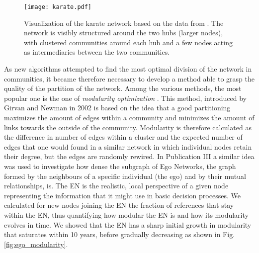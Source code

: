  \begin{figure}[h]
\centering
\texttt{[image: karate.pdf]}%
\caption{Visualization of the karate network based on the data from \cite{10.2307/3629752}. The network is visibly structured around the two hubs 
(larger nodes), with clustered communities around each hub and a few nodes acting as intermediaries between the two communities.}
\label{fig:karate}
\end{figure}

As new algorithms attempted to find the most optimal division of the network in communities, it 
became therefore necessary to develop a method able to grasp the quality of the partition of the network. Among the various methods, the most popular one is the one of \textit{modularity optimization} \cite{Fortunato201075}.
This method, introduced by Girvan and Newman in 2002 \cite{Girvan11062002} is based on the idea that a good partitioning maximizes the amount of edges within a community and minimizes the amount of links towards the outside of the community. 
Modularity is therefore calculated as the difference in number of edges within a cluster and the expected number of edges that one would found in a similar network in which
individual nodes retain their degree, but the edges are randomly rewired. In Publication III a similar idea was used to investigate how dense the subgraph of Ego Networks, the graph formed by the neighbours of a specific individual (the ego) and by their mutual relationships, is. 
The EN is the realistic, local perspective of a given node representing the information that it might use in basic decision processes.
We calculated for new nodes joining the EN the fraction of references that stay within the EN, thus quantifying how modular the EN is and
how its modularity evolves in time. We showed that the EN has a sharp initial growth in modularity that saturates within 10 years,
before gradually decreasing as shown in Fig.\ref{fig:ego_modularity}.

